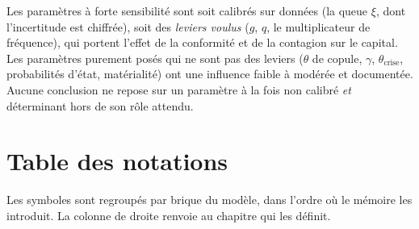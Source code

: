 \vspace{4pt}

Les paramètres à forte sensibilité sont soit calibrés sur données (la queue $\xi$, dont
l'incertitude est chiffrée), soit des \emph{leviers voulus} ($g$, $q$, le multiplicateur de
fréquence), qui portent l'effet de la conformité et de la contagion sur le capital. Les paramètres purement posés qui
ne sont pas des leviers ($\theta$ de copule, $\gamma$, $\theta_{\text{crise}}$, probabilités d'état,
matérialité) ont une influence faible à modérée et documentée. Aucune conclusion ne
repose sur un paramètre à la fois non calibré \emph{et} déterminant hors de son rôle attendu.

\section{Table des notations}

\label{not:ann:notations}

\noindent Les symboles sont regroupés par brique du modèle, dans l'ordre où le mémoire les
introduit. La colonne de droite renvoie au chapitre qui les définit.

